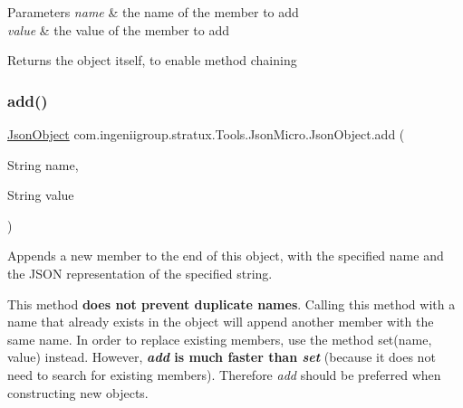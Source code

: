 \begin{DoxyParams}{Parameters}
{\em name} & the name of the member to add \\
\hline
{\em value} & the value of the member to add \\
\hline
\end{DoxyParams}
\begin{DoxyReturn}{Returns}
the object itself, to enable method chaining 
\end{DoxyReturn}
\mbox{\label{classcom_1_1ingeniigroup_1_1stratux_1_1_tools_1_1_json_micro_1_1_json_object_a43918d7828181e1249e93e74673022cf}} 
\subsubsection{\texorpdfstring{add()}{add()}\hspace{0.1cm}{\footnotesize\ttfamily [6/7]}}
{\footnotesize\ttfamily \hyperlink{classcom_1_1ingeniigroup_1_1stratux_1_1_tools_1_1_json_micro_1_1_json_object}{Json\+Object} com.\+ingeniigroup.\+stratux.\+Tools.\+Json\+Micro.\+Json\+Object.\+add (\begin{DoxyParamCaption}\item[{String}]{name,  }\item[{String}]{value }\end{DoxyParamCaption})}

Appends a new member to the end of this object, with the specified name and the J\+S\+ON representation of the specified string. 

This method {\bfseries does not prevent duplicate names}. Calling this method with a name that already exists in the object will append another member with the same name. In order to replace existing members, use the method {\ttfamily set(name, value)} instead. However, {\bfseries  {\itshape add} is much faster than {\itshape set}} (because it does not need to search for existing members). Therefore {\itshape add} should be preferred when constructing new objects. 


